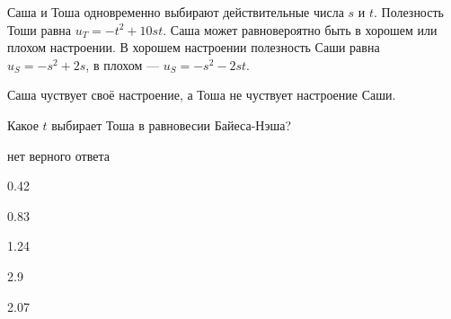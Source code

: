 
\begin{question}
Саша и Тоша одновременно выбирают действительные числа \(s\) и \(t\).
Полезность Тоши равна \(u_T = -t^2 + 10st\). Саша может равновероятно
быть в хорошем или плохом настроении. В хорошем настроении полезность
Саши равна \(u_S = -s^2 + 2s\), в плохом --- \(u_S = -s^2 - 2st\).

Саша чуствует своё настроение, а Тоша не чуствует настроение Саши.

Какое \(t\) выбирает Тоша в равновесии Байеса-Нэша?
\begin{answerlist}
  \item нет верного ответа
  \item 0.42
  \item 0.83
  \item 1.24
  \item 2.9
  \item 2.07
\end{answerlist}
\end{question}


